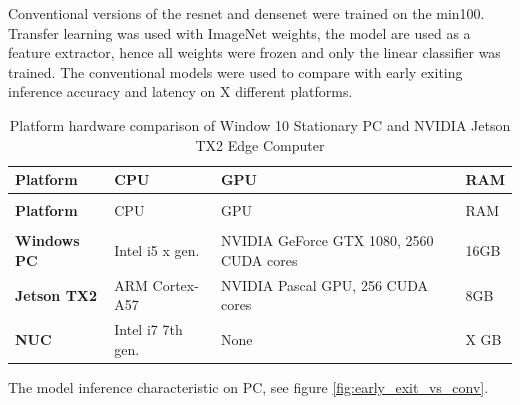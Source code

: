 Conventional versions of the \gls{resnet} and \gls{densenet} were trained on the \gls{min100}. Transfer learning was used with ImageNet weights, the model are used as a feature extractor, hence all weights were frozen and only the linear classifier was trained. The conventional models were used to compare with early exiting inference accuracy and latency on X different platforms.


\begin{longtabu}{>{\bfseries}X|X|X|X}
	\caption[Platform hardware comparison]{Platform hardware comparison of Window 10 Stationary PC and NVIDIA Jetson TX2 Edge Computer} \label{tbl:platforms} \\
	\toprule
	\rowfont{\bfseries}
	Platform & CPU & GPU & RAM  \tabularnewline
	\bottomrule
	\endfirsthead
	\\
	\toprule
	\rowfont{\bfseries}
	Platform & CPU & GPU & RAM  \tabularnewline
	\bottomrule
	\endhead %
	\bottomrule
	\\
	\endfoot
	\hline
	\endlastfoot
	Windows PC	& Intel i5 x gen.	& NVIDIA GeForce GTX 1080, 2560 CUDA cores	& 16GB \tabularnewline
	\hline
	Jetson TX2	& ARM Cortex-A57 	& NVIDIA Pascal GPU, 256 CUDA cores 		& 8GB \tabularnewline
	NUC		  	& Intel i7 7th gen.	& None										& X GB \tabularnewline									
	\bottomrule
\end{longtabu}

The model inference characteristic on PC, see figure \ref{fig:early_exit_vs_conv}.

